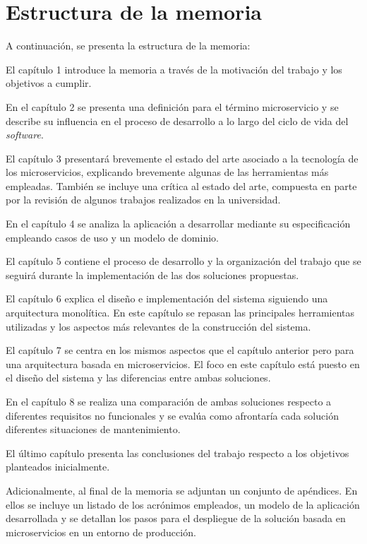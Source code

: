 \documentclass[11pt,spanish,listoffigures]{tfgetsinf}
\begin{document}
\section{Estructura de la memoria}

A continuación, se presenta la estructura de la memoria:

El capítulo 1 introduce la memoria a través de la motivación del trabajo y los objetivos a cumplir.

En el capítulo 2 se presenta una definición para el término microservicio y se describe su influencia en el proceso de desarrollo a lo largo del ciclo de vida del \textit{software}.

El capítulo 3 presentará brevemente el estado del arte asociado a la tecnología de los microservicios, explicando brevemente algunas de las herramientas más empleadas. También se incluye una crítica al estado del arte, compuesta en parte por la revisión de algunos trabajos realizados en la universidad.

En el capítulo 4 se analiza la aplicación a desarrollar mediante su especificación   empleando casos de uso y un modelo de dominio.

El capítulo 5 contiene el proceso de desarrollo y la organización del trabajo que se seguirá durante la implementación de las dos soluciones propuestas.

El capítulo 6 explica el diseño e implementación del sistema siguiendo una arquitectura monolítica. En este capítulo se repasan las principales herramientas utilizadas y los aspectos más relevantes de la construcción del sistema.

El capítulo 7 se centra en los mismos aspectos que el capítulo anterior pero para una arquitectura basada en microservicios. El foco en este capítulo está puesto en el diseño del sistema y las diferencias entre ambas soluciones.

En el capítulo 8 se realiza una comparación de ambas soluciones respecto a diferentes requisitos no funcionales  y se evalúa como afrontaría cada solución diferentes situaciones de mantenimiento.

El último capítulo presenta las conclusiones del trabajo respecto a los objetivos planteados inicialmente.

Adicionalmente, al final de la memoria se adjuntan un conjunto de apéndices. En ellos  se incluye un listado de los acrónimos empleados, un modelo de la aplicación desarrollada y se detallan los pasos para el despliegue de la solución basada en microservicios en un entorno de producción.
\end{document}
